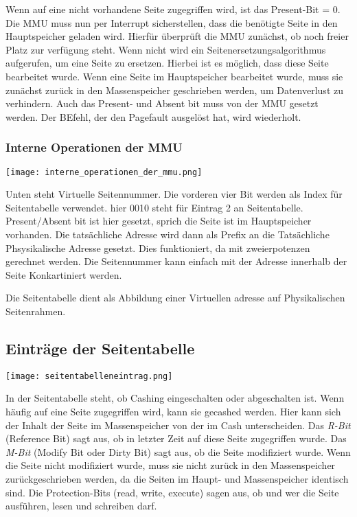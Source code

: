 Wenn auf eine nicht vorhandene Seite zugegriffen wird, ist das Present-Bit = 0.
Die MMU muss nun per Interrupt sicherstellen, dass die benötigte Seite in den
Hauptspeicher geladen wird. Hierfür überprüft die MMU zunächst, ob noch freier
Platz zur verfügung steht. Wenn nicht wird ein Seitenersetz\-ungsalgorithmus
aufgerufen, um eine Seite zu ersetzen. Hierbei ist es möglich, dass diese Seite
bearbeitet wurde. Wenn eine Seite im Hauptspeicher bearbeitet wurde, muss sie
zunächst zurück in den Massenspeicher geschrieben werden, um Datenverlust zu
verhindern. Auch das Present- und Absent bit muss von der MMU gesetzt werden.
Der BEfehl, der den Pagefault ausgelöst hat, wird wiederholt.

\subsubsection{Interne Operationen der MMU}

\texttt{[image: interne\_operationen\_der\_mmu.png]}

Unten steht Virtuelle Seitennummer. Die vorderen vier Bit werden als Index für
Seitentabelle verwendet. hier 0010 steht für Eintrag 2 an Seitentabelle.
Present/Absent bit ist hier gesetzt, sprich die Seite ist im Hauptspeicher
vorhanden. Die tatsächliche Adresse wird dann als Prefix an die Tatsächliche
Phsysikalische Adresse gesetzt. Dies funktioniert, da mit zweierpotenzen
gerechnet werden. Die Seitennummer kann einfach mit der Adresse innerhalb der
Seite Konkartiniert werden.

Die Seitentabelle dient als Abbildung einer Virtuellen adresse auf
Physikalischen Seitenrahmen.

\subsection{Einträge der Seitentabelle}

\texttt{[image: seitentabelleneintrag.png]}

In der Seitentabelle steht, ob Cashing eingeschalten oder abgeschalten ist.
Wenn häufig auf eine Seite zugegriffen wird, kann sie gecashed werden. Hier
kann sich der Inhalt der Seite im Massenspeicher von der im Cash unterscheiden.
Das \textit{R-Bit} (Reference Bit) sagt aus, ob in letzter Zeit auf diese Seite
zugegriffen wurde. Das \textit{M-Bit} (Modify Bit oder Dirty Bit) sagt aus, ob
die Seite modifiziert wurde. Wenn die Seite nicht modifiziert wurde, muss sie
nicht zurück in den Massenspeicher zurückgeschrieben werden, da die Seiten im
Haupt- und Massenspeicher identisch sind. Die Protection-Bits (read, write,
execute) sagen aus, ob und wer die Seite ausführen, lesen und schreiben darf.

